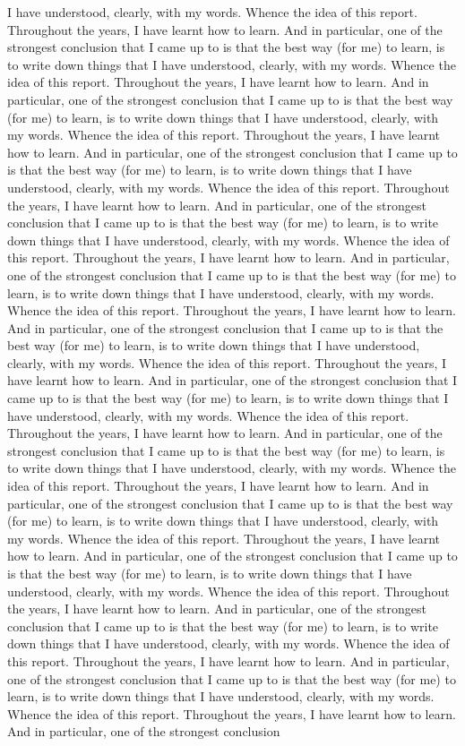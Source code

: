 \documentclass[12pt]{book}
\begin{document}
I have understood, clearly, with my words. Whence the idea of this report. Throughout the years, I have learnt how to learn. And in particular, one of the strongest conclusion that I came up to is that the best way (for me) to learn, is to write down things that I have understood, clearly, with my words. Whence the idea of this report. Throughout the years, I have learnt how to learn. And in particular, one of the strongest conclusion that I came up to is that the best way (for me) to learn, is to write down things that I have understood, clearly, with my words. Whence the idea of this report. Throughout the years, I have learnt how to learn. And in particular, one of the strongest conclusion that I came up to is that the best way (for me) to learn, is to write down things that I have understood, clearly, with my words. Whence the idea of this report. Throughout the years, I have learnt how to learn. And in particular, one of the strongest conclusion that I came up to is that the best way (for me) to learn, is to write down things that I have understood, clearly, with my words. Whence the idea of this report. Throughout the years, I have learnt how to learn. And in particular, one of the strongest conclusion that I came up to is that the best way (for me) to learn, is to write down things that I have understood, clearly, with my words. Whence the idea of this report. Throughout the years, I have learnt how to learn. And in particular, one of the strongest conclusion that I came up to is that the best way (for me) to learn, is to write down things that I have understood, clearly, with my words. Whence the idea of this report. Throughout the years, I have learnt how to learn. And in particular, one of the strongest conclusion that I came up to is that the best way (for me) to learn, is to write down things that I have understood, clearly, with my words. Whence the idea of this report. Throughout the years, I have learnt how to learn. And in particular, one of the strongest conclusion that I came up to is that the best way (for me) to learn, is to write down things that I have understood, clearly, with my words. Whence the idea of this report. Throughout the years, I have learnt how to learn. And in particular, one of the strongest conclusion that I came up to is that the best way (for me) to learn, is to write down things that I have understood, clearly, with my words. Whence the idea of this report. Throughout the years, I have learnt how to learn. And in particular, one of the strongest conclusion that I came up to is that the best way (for me) to learn, is to write down things that I have understood, clearly, with my words. Whence the idea of this report. Throughout the years, I have learnt how to learn. And in particular, one of the strongest conclusion that I came up to is that the best way (for me) to learn, is to write down things that I have understood, clearly, with my words. Whence the idea of this report. Throughout the years, I have learnt how to learn. And in particular, one of the strongest conclusion that I came up to is that the best way (for me) to learn, is to write down things that I have understood, clearly, with my words. Whence the idea of this report. Throughout the years, I have learnt how to learn. And in particular, one of the strongest conclusion 
\end{document}

